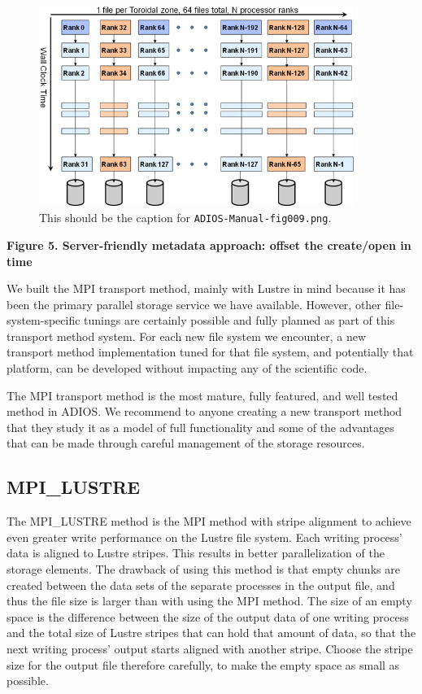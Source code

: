 \begin{figure}[htbp]
\begin{center}
\includegraphics[width=290pt, height=185pt]{ADIOS-Manual-fig009.png}
\caption{This should be the caption for \texttt{ADIOS-Manual-fig009.png}.}
\end{center}
\end{figure}\label{HRef140733021}\label{HRef140744843}\label{HToc144350164}

\begin{center}
{\color{color20} \textbf{Figure 5. Server-friendly metadata approach: offset the 
create/open in time}}
\end{center}

We built the MPI transport method, mainly with Lustre in mind because it has been 
the primary parallel storage service we have available. However, other file-system-specific 
tunings are certainly possible and fully planned as part of this transport method 
system. For each new file system we encounter, a new transport method implementation 
tuned for that file system, and potentially that platform, can be developed without 
impacting any of the scientific code.

The MPI transport method is the most mature, fully featured, and well tested method 
in ADIOS. We recommend to anyone creating a new transport method that they study 
it as a model of full functionality and some of the advantages that can be made 
through careful management of the storage resources.\label{HToc84890260}\label{HToc212016636}\label{HToc212016878}\label{HToc182553384}

\subsection{MPI\_LUSTRE}

The MPI\_LUSTRE method is the MPI method with stripe alignment to achieve even 
greater write performance on the Lustre file system. Each writing process' data 
is aligned to Lustre stripes. This results in better parallelization of the storage 
elements. The drawback of using this method is that empty chunks are created between 
the data sets of the separate processes in the output file, and thus the file size 
is larger than with using the MPI method. The size of an empty space is the difference 
between the size of the output data of one writing process and the total size of 
Lustre stripes that can hold that amount of data, so that the next writing process' 
output starts aligned with another stripe. Choose the stripe size for the output 
file therefore carefully, to make the empty space as small as possible. 

